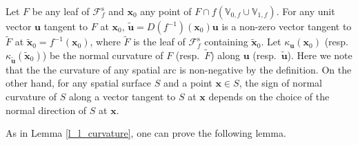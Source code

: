 \documentclass{amsart}
\theoremstyle{definition}
\numberwithin{equation}{section}
\numberwithin{figure}{section}
\begin{document}
Let $F$ be any leaf of $\mathcal{F}_f^{\mathrm{s}}$ and $\boldsymbol{x}_0$ any point of $F\cap f(\mathbb{V}_{0,f}\cup \mathbb{V}_{1,f})$.
For any unit vector $\boldsymbol{u}$ tangent to $F$ at $\boldsymbol{x}_0$, $\widetilde{ \boldsymbol{u}}=D(f^{-1})(\boldsymbol{x}_0)\boldsymbol{u}$ 
is a non-zero vector tangent to $\widetilde F$ at $\widetilde{\boldsymbol{x}}_0=f^{-1}(\boldsymbol{x}_0)$, 
where $\widetilde F$ is the leaf of $\mathcal{F}_f^{\mathrm{s}}$ containing $\widetilde{\boldsymbol{x}}_0$.
Let $\kappa_{\boldsymbol{u}}(\boldsymbol{x}_0)$ (resp.\ $\kappa_{\widetilde{\boldsymbol{u}}}(\widetilde{\boldsymbol{x}}_0)$) be the normal curvature of $F$ (resp.\ 
$\widetilde F$) along $\boldsymbol{u}$ (resp.\ $\widetilde{\boldsymbol{u}}$).
Here we note that the the curvature of any spatial arc is non-negative by the definition.
On the other hand, for any spatial surface $S$ and a point $\boldsymbol{x}\in S$, 
the sign of normal curvature of $S$ along a vector tangent to $S$ at $\boldsymbol{x}$ depends on 
the choice of the normal direction of $S$ at $\boldsymbol{x}$.

As in Lemma \ref{l_l_curvature}, one can prove the following lemma.
\end{document}
